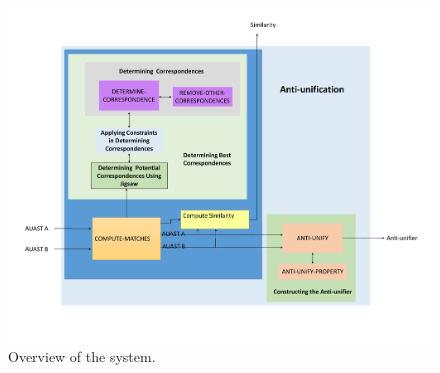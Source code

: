 



\begin{figure} [H]
  \centering\includegraphics [width = \textwidth]{Drawing4/overview1.pdf}
  \caption{Overview of the system.}
  \label{fig:meth_overview}
\end{figure}


